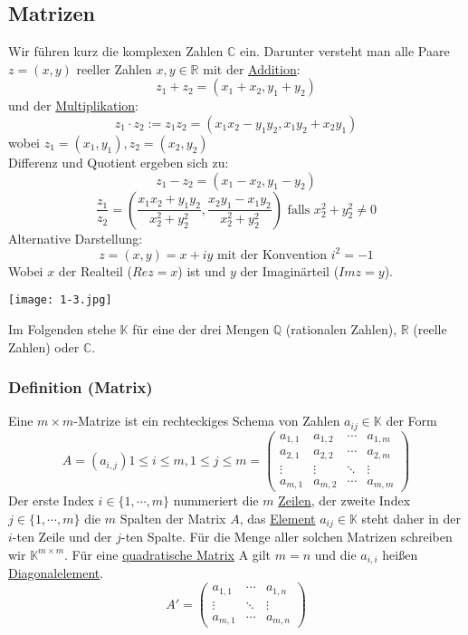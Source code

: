\subsection{Matrizen}
Wir führen kurz die komplexen Zahlen $\mathbb{C}$ ein.  Darunter versteht man alle Paare $z=(x,y)$ reeller Zahlen $x,y\in \mathbb{R}$ mit der \underline{Addition}: \[z_1+z_2=(x_1+x_2,y_1+y_2)\] und der \underline{Multiplikation}: \[z_1\cdot z_2:=z_1z_2=(x_1x_2-y_1y_2,x_1y_2+x_2y_1)\] wobei $z_1=(x_1,y_1),z_2=(x_2,y_2)$ \\
Differenz und Quotient ergeben sich zu:
\[ z_1-z_2=(x_1-x_2,y_1-y_2)\]
\[\dfrac{z_1}{z_2} = \left(\dfrac{x_1x_2+y_1y_2}{x_2^2+y_2^2},\dfrac{x_2y_1-x_1y_2}{x_2^2+y_2^2}\right) \text{ falls } x_2^2+y_2^2\not = 0\]
Alternative Darstellung:
\[z=(x,y) = x+iy \text{ mit der Konvention } i^2=-1\]
Wobei $x$ der Realteil ($Rez=x$) ist und $y$ der Imaginärteil ($Imz=y$).\\
\begin{center}
\texttt{[image: 1-3.jpg]}
\end{center}
Im Folgenden stehe $\mathbb{K}$ für eine der drei Mengen $\mathbb{Q}$ (rationalen Zahlen), $\mathbb{R}$ (reelle Zahlen) oder $\mathbb{C}$.
\subsubsection{Definition (Matrix)}
Eine $m\times m$-Matrize ist ein rechteckiges Schema von Zahlen $a_{ij}\in \mathbb{K}$ der Form \[A=(a_{i,j}) 1\leq i\leq m,1\leq j\leq m =\left( \begin{array}{cccc}a_{1,1}& a_{1,2}& \cdots & a_{1,m}\\ a_{2,1}& a_{2,2}& \cdots & a_{2,m} \\ \vdots & \vdots & \ddots & \vdots \\ a_{m,1}& a_{m,2}& \cdots & a_{m,m}\end{array}\right) \]
Der erste Index $i\in\{1,\cdots ,m\}$ nummeriert die $m$ \underline{Zeilen}, der zweite Index $j\in \{1,\cdots ,m\}$ die $m$ Spalten der Matrix $A$, das \underline{Element} $a_{ij}\in \mathbb{K}$ steht daher in der $i$-ten Zeile und der $j$-ten Spalte.  Für die Menge aller solchen Matrizen schreiben wir $\mathbb{K}^{m\times m}$. Für eine \underline{quadratische Matrix} A gilt $m = n$ und die $a_{i,i}$ heißen \underline{Diagonalelement}.
\[A'=\left( \begin{array}{ccc}a_{1,1}& \cdots & a_{1,n}\\\vdots & \ddots & \vdots\\a_{m,1}& \cdots & a_{m,n}\end{array}\right)\]
